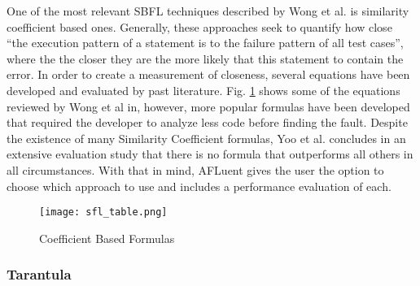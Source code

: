 One of the most relevant SBFL techniques described by Wong et al.
\cite{wong2016survey} is similarity coefficient based ones. Generally, these approaches
seek to quantify how close ``the execution pattern of a statement is to the
failure pattern of all test cases'', where the the closer they are the more
likely that this statement to contain the error. In order to create a
measurement of closeness, several equations have been developed and evaluated by
past literature. Fig. \ref{fig:sbfl_eq} shows some of the equations reviewed by
Wong et al in, however, more popular formulas have been developed that
required the developer to analyze less code before finding the fault. Despite
the existence of many Similarity Coefficient formulas, Yoo et al.
\cite{yoo2014no} concludes in an extensive evaluation study that there is no
formula that outperforms all others in all circumstances. With that in mind,
AFLuent gives the user the option to choose which approach to use and includes
a performance evaluation of each.

\begin{figure}[!htb]
	\begin{center}
		\texttt{[image: sfl\_table.png]}
		\caption{\label{fig:sbfl_eq} Coefficient Based Formulas \cite{wong2016survey}}
	\end{center}
\end{figure}

\subsubsection{Tarantula}
\label{subsubsec:tarantula_lit}

